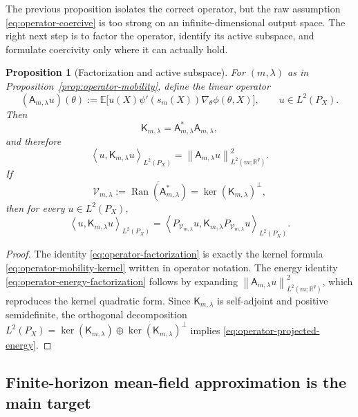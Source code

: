 \documentclass[11pt]{article}
\newtheorem{proposition}[theorem]{Proposition}
\theoremstyle{definition}
\newcommand{\R}{\mathbb{R}}
\newcommand{\E}{\mathbb{E}}
\newcommand{\ip}[2]{\left\langle #1, #2 \right\rangle}
\newcommand{\norm}[1]{\left\lVert #1 \right\rVert}
\newcommand{\mc}[1]{\mathcal{#1}}
\begin{document}
The previous proposition isolates the correct operator, but the raw assumption
\eqref{eq:operator-coercive} is too strong on an infinite-dimensional output
space. The right next step is to factor the operator, identify its active
subspace, and formulate coercivity only where it can actually hold.

\begin{proposition}[Factorization and active subspace]
\label{prop:operator-factorization}
For $(m,\lambda)$ as in Proposition~\ref{prop:operator-mobility}, define the
linear operator
\[
  (\mathsf{A}_{m,\lambda}u)(\theta)
  :=
  \E\big[
    u(X)\psi'(s_m(X))\nabla_\theta \phi(\theta,X)
  \big],
  \qquad
  u\in L^2(P_X).
\]
Then
\begin{equation}
  \mathsf{K}_{m,\lambda}
  =
  \mathsf{A}_{m,\lambda}^\ast \mathsf{A}_{m,\lambda},
  \label{eq:operator-factorization}
\end{equation}
and therefore
\begin{equation}
  \ip{u}{\mathsf{K}_{m,\lambda}u}_{L^2(P_X)}
  =
  \norm{\mathsf{A}_{m,\lambda}u}_{L^2(m;\R^q)}^2.
  \label{eq:operator-energy-factorization}
\end{equation}
If
\[
  \mc{V}_{m,\lambda}
  :=
  \overline{\operatorname{Ran}(\mathsf{A}_{m,\lambda}^\ast)}
  =
  \ker(\mathsf{K}_{m,\lambda})^\perp,
\]
then for every $u\in L^2(P_X)$,
\begin{equation}
  \ip{u}{\mathsf{K}_{m,\lambda}u}_{L^2(P_X)}
  =
  \ip{
    P_{\mc{V}_{m,\lambda}}u
  }{
    \mathsf{K}_{m,\lambda}P_{\mc{V}_{m,\lambda}}u
  }_{L^2(P_X)}.
  \label{eq:operator-projected-energy}
\end{equation}
\end{proposition}

\begin{proof}
The identity \eqref{eq:operator-factorization} is exactly the kernel formula
\eqref{eq:operator-mobility-kernel} written in operator notation. The energy
identity \eqref{eq:operator-energy-factorization} follows by expanding
$\norm{\mathsf{A}_{m,\lambda}u}_{L^2(m;\R^q)}^2$, which reproduces the kernel
quadratic form. Since $\mathsf{K}_{m,\lambda}$ is self-adjoint and positive
semidefinite, the orthogonal decomposition
$L^2(P_X)=\ker(\mathsf{K}_{m,\lambda})\oplus \ker(\mathsf{K}_{m,\lambda})^\perp$
implies \eqref{eq:operator-projected-energy}.
\end{proof}

\subsection{Finite-horizon mean-field approximation is the main target}
\end{document}
